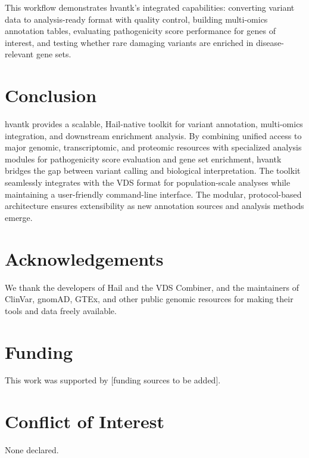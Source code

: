\documentclass[11pt]{article}
\begin{document}
This workflow demonstrates hvantk's integrated capabilities: converting variant data to analysis-ready format with quality control, building multi-omics annotation tables, evaluating pathogenicity score performance for genes of interest, and testing whether rare damaging variants are enriched in disease-relevant gene sets.

\section{Conclusion}

hvantk provides a scalable, Hail-native toolkit for variant annotation, multi-omics integration, and downstream enrichment analysis. By combining unified access to major genomic, transcriptomic, and proteomic resources with specialized analysis modules for pathogenicity score evaluation and gene set enrichment, hvantk bridges the gap between variant calling and biological interpretation. The toolkit seamlessly integrates with the VDS format for population-scale analyses while maintaining a user-friendly command-line interface. The modular, protocol-based architecture ensures extensibility as new annotation sources and analysis methods emerge.

\section*{Acknowledgements}

We thank the developers of Hail and the VDS Combiner, and the maintainers of ClinVar, gnomAD, GTEx, and other public genomic resources for making their tools and data freely available.

\section*{Funding}

This work was supported by [funding sources to be added].

\section*{Conflict of Interest}

None declared.



\end{document}
